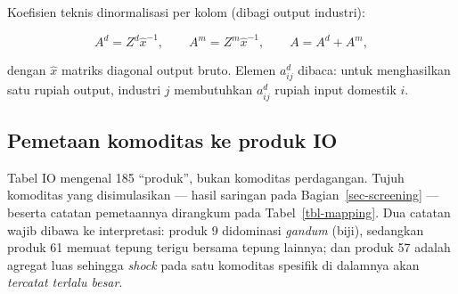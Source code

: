 \documentclass[
  manuscript=article,
  layout=publish,
  year=2026,
  volume=1,
]{den}
\begin{document}
Koefisien teknis dinormalisasi per kolom (dibagi output industri):

\[
A^{d} = Z^{d} \hat{x}^{-1}, \qquad
A^{m} = Z^{m} \hat{x}^{-1}, \qquad
A = A^{d} + A^{m},
\]

dengan \(\hat{x}\) matriks diagonal output bruto. Elemen \(a^{d}_{ij}\)
dibaca: untuk menghasilkan satu rupiah output, industri \(j\)
membutuhkan \(a^{d}_{ij}\) rupiah input domestik \(i\).

\subsection{Pemetaan komoditas ke produk IO}\label{sec-mapping}

Tabel IO mengenal 185 ``produk'', bukan komoditas perdagangan. Tujuh
komoditas yang disimulasikan --- hasil saringan pada
Bagian~\ref{sec-screening} --- beserta catatan pemetaannya dirangkum
pada Tabel~\ref{tbl-mapping}. Dua catatan wajib dibawa ke interpretasi:
produk 9 didominasi \emph{gandum} (biji), sedangkan produk 61 memuat
tepung terigu bersama tepung lainnya; dan produk 57 adalah agregat luas
sehingga \emph{shock} pada satu komoditas spesifik di dalamnya akan
\emph{tercatat terlalu besar}.
\end{document}
